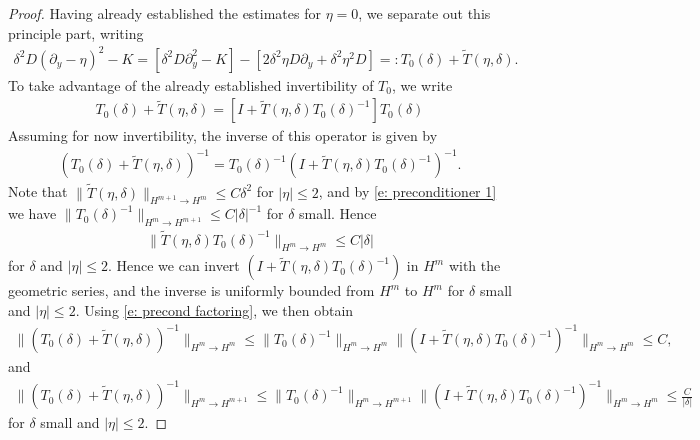 \documentclass[11pt]{article}
\numberwithin{equation}{section}
\numberwithin{prop}{section}
\begin{document}
\begin{proof}
	Having already established the estimates for $\eta = 0$, we separate out this principle part, writing
	\begin{align*}
		\delta^2 D (\partial_y - \eta)^2 - K = [\delta^2 D \partial_y^2 - K] - [2 \delta^2 \eta D \partial_y + \delta^2 \eta^2 D] =: T_0(\delta) + \tilde{T}(\eta, \delta). 
	\end{align*}
	To take advantage of the already established invertibility of $T_0$, we write
	\begin{align*}
		T_0(\delta) + \tilde{T}(\eta, \delta) = [I + \tilde{T}(\eta, \delta) T_0(\delta)^{-1}] T_0(\delta)
	\end{align*}
	Assuming for now invertibility, the inverse of this operator is given by
	\begin{align}
		(T_0(\delta) + \tilde{T}(\eta, \delta))^{-1} = T_0(\delta)^{-1} (I + \tilde{T}(\eta, \delta) T_0(\delta)^{-1})^{-1}. \label{e: precond factoring}
	\end{align}
	Note that $\| \tilde{T} (\eta, \delta) \|_{H^{m+1} \to H^m} \leq C \delta^2$ for $|\eta| \leq 2$, and by \eqref{e: preconditioner 1} we have $\| T_0 (\delta)^{-1} \|_{H^m \to H^{m+1}} \leq C |\delta|^{-1}$ for $\delta$ small. Hence
	\begin{align*}
		\| \tilde{T}(\eta, \delta) T_0(\delta)^{-1}\|_{H^m \to H^m} \leq C |\delta|
	\end{align*}
	for $\delta$ and $|\eta| \leq 2$. Hence we can invert $(I + \tilde{T}(\eta, \delta) T_0(\delta)^{-1})$ in $H^m$ with the geometric series, and the inverse is uniformly bounded from $H^m$ to $H^m$ for $\delta$ small and $|\eta| \leq 2$. Using \eqref{e: precond factoring}, we then obtain
	\begin{align*}
		\| (T_0(\delta) + \tilde{T}(\eta, \delta))^{-1} \|_{H^m \to H^m} \leq \| T_0 (\delta)^{-1} \|_{H^m \to H^m} \| (I + \tilde{T}(\eta, \delta) T_0(\delta)^{-1})^{-1} \|_{H^m \to H^m} \leq C,
	\end{align*}
	and 
	\begin{align}
		\| (T_0(\delta) + \tilde{T}(\eta, \delta))^{-1} \|_{H^m \to H^{m+1}} \leq \| T_0 (\delta)^{-1} \|_{H^m \to H^{m+1}} \| (I + \tilde{T}(\eta, \delta) T_0(\delta)^{-1})^{-1} \|_{H^m \to H^m} \leq \frac{C}{|\delta|}
	\end{align}
	for $\delta$ small and $|\eta| \leq 2$. 
\end{proof}
\end{document}
